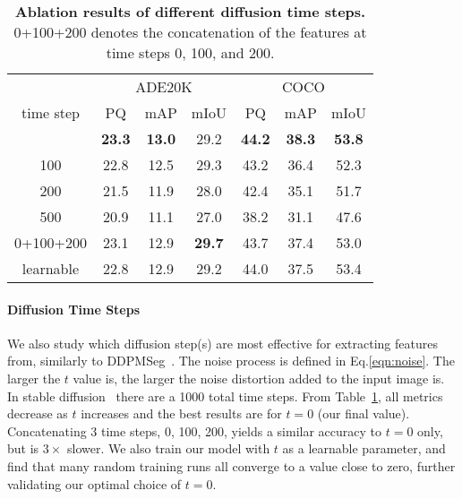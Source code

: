 \documentclass[10pt,twocolumn,letterpaper]{article}
\newcommand{\tablestyle}[2]{\setlength{\tabcolsep}{#1}\renewcommand{\arraystretch}{#2}\centering\small}
\begin{document}
\begin{table}[]
\tablestyle{6pt}{1.1}
\begin{tabular}{c|ccc|ccc}
          & \multicolumn{3}{c|}{ADE20K}                    & \multicolumn{3}{c}{COCO}                      \\
time step  & PQ            & mAP           & mIoU          & PQ            & mAP           & mIoU          \\
\shline
0         & \textbf{23.3} & \textbf{13.0} & 29.2 & \textbf{44.2} & \textbf{38.3} & \textbf{53.8} \\
100       & 22.8          & 12.5          & 29.3          & 43.2          & 36.4          & 52.3          \\
200       & 21.5          & 11.9          & 28.0          & 42.4          & 35.1          & 51.7          \\
500       & 20.9          & 11.1          & 27.0          & 38.2          & 31.1          & 47.6          \\
0+100+200 & 23.1          & 12.9          & \textbf{29.7}          & 43.7          & 37.4          & 53.0          \\
\hline
learnable & 22.8          & 12.9          & 29.2          & 44.0          & 37.5          & 53.4            
\end{tabular}
\vspace{-.5em}
\caption{
    \label{tab:step}
    \textbf{Ablation results of different diffusion time steps.} 0+100+200 denotes the concatenation of the features at time steps 0, 100, and 200.
}
\vspace{-1.5em}
\end{table}
\paragraph{Diffusion Time Steps}
We also study which diffusion step(s) are most effective for extracting features from, similarly to DDPMSeg~\cite{baranchuk2021ddpmseg}.
The noise process is defined in Eq.\ref{eqn:noise}. The larger the $t$ value is, the larger the noise distortion added to the input image is.
In stable diffusion~\cite{rombach2022ldm} there are a 1000 total time steps. 
From Table~\ref{tab:step}, all metrics decrease as $t$ increases and the best results are for $t{=}0$ (our final value). 
Concatenating 3 time steps, 0, 100, 200, yields a similar accuracy to $t{=}0$ only, but is $3{\times}$ slower. 
We also train our model with $t$ as a learnable parameter, and find that many random training runs all converge to a value close to zero, further validating our optimal choice of $t{=}0$.
\end{document}
